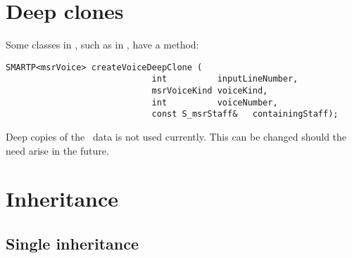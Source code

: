 \section{Deep clones}

Some classes in \mf, such as  in , have a  method:
\begin{lstlisting}[language=CPlusPlus]
     SMARTP<msrVoice> createVoiceDeepClone (
                             int          inputLineNumber,
                             msrVoiceKind voiceKind,
                             int          voiceNumber,
                             const S_msrStaff&   containingStaff);
\end{lstlisting}

Deep copies of the \msrRepr\ data is not used currently. This can be changed should the need arise in the future.


\section{Inheritance}

\subsection{Single inheritance}

